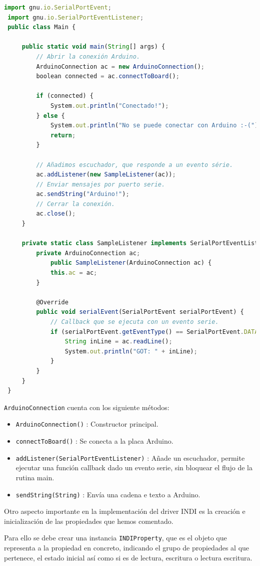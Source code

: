 \begin{lstlisting}[language=javascript, caption={Ejemplo biblioteca \texttt{SerialCommand}},label={lst:ejemplo_libreria_serial_commandd}]
 import gnu.io.SerialPortEvent;
 import gnu.io.SerialPortEventListener;
 public class Main {
 
	 public static void main(String[] args) { 
		 // Abrir la conexión Arduino.
		 ArduinoConnection ac = new ArduinoConnection();
		 boolean connected = ac.connectToBoard();
		 
		 if (connected) {
			 System.out.println("Conectado!");
		 } else {
			 System.out.println("No se puede conectar con Arduino :-(");
			 return;
		 }
		 
		 // Añadimos escuchador, que responde a un evento série.
		 ac.addListener(new SampleListener(ac));
		 // Enviar mensajes por puerto serie.
		 ac.sendString("Arduino!");
		 // Cerrar la conexión.
		 ac.close();
	 }
	 
	 private static class SampleListener implements SerialPortEventListener {	 
		 private ArduinoConnection ac;	 
			 public SampleListener(ArduinoConnection ac) {
			 this.ac = ac;
		 }
		 		 
		 @Override
		 public void serialEvent(SerialPortEvent serialPortEvent) {
			 // Callback que se ejecuta con un evento serie.
			 if (serialPortEvent.getEventType() == SerialPortEvent.DATA_AVAILABLE) {
				 String inLine = ac.readLine();
				 System.out.println("GOT: " + inLine);
			 }
		 }
	 }
 }
\end{lstlisting}


\texttt{ArduinoConnection} cuenta con los siguiente métodos:

\begin{itemize}
	\item \texttt{ArduinoConnection()} : Constructor principal.
	\item \texttt{connectToBoard()} : Se conecta a la placa Arduino.
	\item \texttt{addListener(SerialPortEventListener)} : Añade un escuchador, permite ejecutar una función callback dado un evento serie, sin bloquear el flujo de la rutina main.
	\item \texttt{sendString(String)} : Envía una cadena e texto a Arduino.
\end{itemize}

Otro aspecto importante en la implementación del driver INDI es la creación e inicialización de las propiedades que hemos comentado.

Para ello se debe crear una instancia \texttt{INDIProperty}, que es el objeto que representa a la propiedad en concreto, indicando el grupo de propiedades al que pertenece, el estado inicial así como si es de lectura, escritura o lectura escritura.

